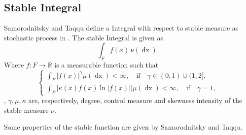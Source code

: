 \documentclass[a4paper, twoside, 11pt]{article}
\theoremstyle{definition}
\begin{document}
\subsection{Stable Integral}
Samorodnitsky and Taqqu define a Integral with respect to stable measure as stochastic process in \cite{samorodnitsky}. The stable Integral is given as 
\begin{equation}
  \int_F f(x)\, \nu(\mathop{dx}).
  \label{sec:stbint}
\end{equation}
Where $f : F \rightarrow \mathbb{R}$ is a measurable function such that 
\begin{equation}
\begin{cases} \int_F |f(x)|^\gamma \mu(\mathop{dx}) < \infty,\hspace{1em} \text{if} \hspace{1em} \gamma \in (0, 1) \cup (1, 2],\\
	\int_F |\kappa(x) f(x) \ln|f(x)||\mu(\mathop{dx}) < \infty,\hspace{1em} \text{if} \hspace{1em} \gamma = 1,
  \end{cases}
\end{equation}
, $\gamma, \mu, \kappa$ are, respectively, degree, control measure and skewness intensity of the stable measure $\nu$.

Some properties of the stable function are given by Samorodnitsky and Taqqu.
\end{document}
